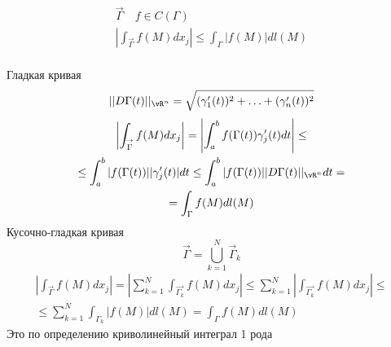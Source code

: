 \documentclass[main]{subfiles}
\begin{document}
\begin{theorem}
    \begin{gather*}
        \stackrel{\rightarrow}{\Gamma} \quad f \in C(\Gamma) \\
        \left| \int_{\stackrel{\rightarrow}{\Gamma}} f(M) dx_j \right| \leq \int_\Gamma |f(M)|dl(M) \\
    \end{gather*}
\end{theorem}
\begin{longProof}
    Гладкая кривая
    \begin{gather*}
        ||D\Gamma(t)||_{{\vR^n}} = \sqrt{(\gamma_1^\prime(t))^2 + \ldots + (\gamma^\prime_n(t))^2}
    \end{gather*}
    \begin{multline*}
        \left| \int_{\stackrel{\rightarrow}{\Gamma}} f(M) dx_j \right| = \left| \int^b_a f(\Gamma(t))\gamma^\prime_j(t) dt \right| \leq\\
        \leq \int^b_a | f(\Gamma(t)) | | \gamma^\prime_j(t)| dt \leq \int^b_a |f(\Gamma(t))||D\Gamma(t)||_{\vR^n} dt = \\
        = \int_{\Gamma} f(M) dl(M)
    \end{multline*}
    Кусочно-гладкая кривая
    \[\stackrel{\rightarrow}{\Gamma} = \bigcup^N_{k=1} \stackrel{\rightarrow}{\Gamma}_k \]
    \begin{multline*}
        \left| \int_{\stackrel{\rightarrow}{\Gamma}} f(M) dx_j \right| = \left| \sum^N_{k=1}
        \int_{\stackrel{\rightarrow}{\Gamma_k}} f(M)dx_j \right| \leq \sum^N_{k=1}
        \left| \int_{\stackrel{\rightarrow}{\Gamma_k}} f(M)dx_j \right| \leq \\
        \leq \sum^N_{k=1}  \int_{\Gamma_k} |f(M)|dl(M) = \int_{\Gamma} f(M)dl(M)
    \end{multline*}
    Это по определению криволинейный интеграл 1 рода
\end{longProof}
\end{document}
